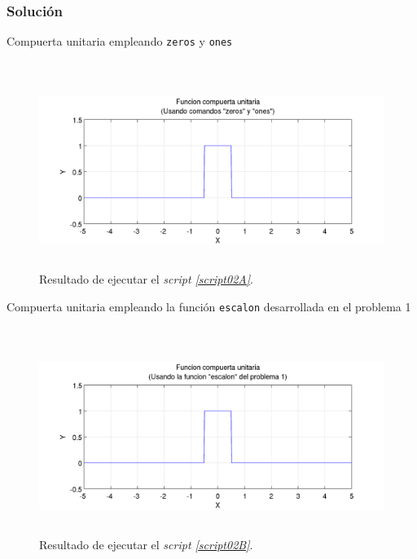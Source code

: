 \documentclass[a4paper,12pt,final]{article}
\begin{document}
    \subsubsection*{Solución}
      \begin{listing}[H]
        \caption{Compuerta unitaria empleando \texttt{zeros} y \texttt{ones}}
        \label{script02A}
        \inputminted[firstline=5]{matlab}{./laboratorio_2/problema02_a.m}
      \end{listing}

      \begin{figure}[H]
        \caption{Resultado de ejecutar el \emph{script \ref{script02A}}.}
        \label{script02Afigure}
        \includegraphics[height=2.5in]{./laboratorio_2/problema02_a.png}
      \end{figure}
      \vspace{\fill}

      \newpage
      \begin{listing}[H]
        \caption{Compuerta unitaria empleando la función \texttt{escalon} desarrollada en el problema 1}
        \label{script02B}
        \inputminted[firstline=5]{matlab}{./laboratorio_2/problema02_b.m}
      \end{listing}

      \begin{figure}[H]
        \caption{Resultado de ejecutar el \emph{script \ref{script02B}}.}
        \label{script02Bfigure}
        \includegraphics[height=2.5in]{./laboratorio_2/problema02_b.png}
      \end{figure}
      \vspace{\fill}
\end{document}
